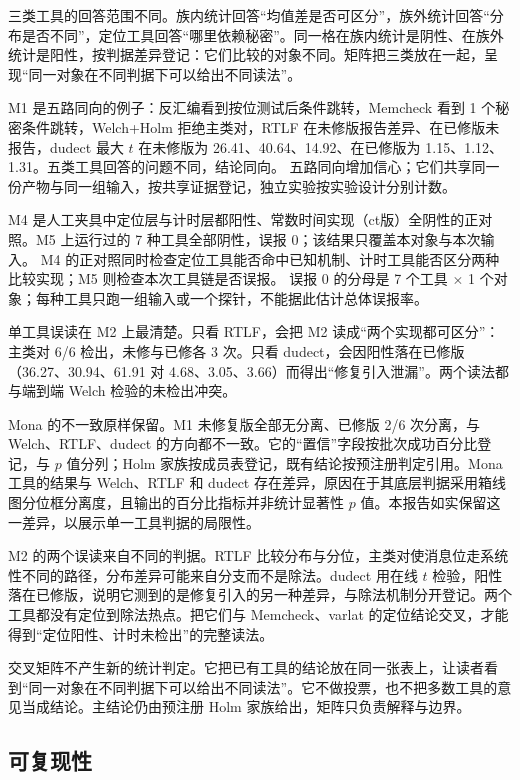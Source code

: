 三类工具的回答范围不同。族内统计回答“均值差是否可区分”，族外统计回答“分布是否不同”，定位工具回答“哪里依赖秘密”。同一格在族内统计是阴性、在族外统计是阳性，按判据差异登记：它们比较的对象不同。矩阵把三类放在一起，呈现“同一对象在不同判据下可以给出不同读法”。

M1 是五路同向的例子：反汇编看到按位测试后条件跳转，Memcheck 看到 1 个秘密条件跳转，Welch+Holm 拒绝主类对，RTLF 在未修版报告差异、在已修版未报告，dudect 最大 $t$ 在未修版为 26.41、40.64、14.92、在已修版为 1.15、1.12、1.31。五类工具回答的问题不同，结论同向。
五路同向增加信心；它们共享同一份产物与同一组输入，按共享证据登记，独立实验按实验设计分别计数。

M4 是人工夹具中定位层与计时层都阳性、常数时间实现（ct版）全阴性的正对照。M5 上运行过的 7 种工具全部阴性，误报 0；该结果只覆盖本对象与本次输入。
M4 的正对照同时检查定位工具能否命中已知机制、计时工具能否区分两种比较实现；M5 则检查本次工具链是否误报。
误报 0 的分母是 7 个工具 $\times$ 1 个对象；每种工具只跑一组输入或一个探针，不能据此估计总体误报率。

单工具误读在 M2 上最清楚。只看 RTLF，会把 M2 读成“两个实现都可区分”：主类对 6/6 检出，未修与已修各 3 次。只看 dudect，会因阳性落在已修版（36.27、30.94、61.91 对 4.68、3.05、3.66）而得出“修复引入泄漏”。两个读法都与端到端 Welch 检验的未检出冲突。\cite{dudect}

Mona 的不一致原样保留。M1 未修复版全部无分离、已修版 2/6 次分离，与 Welch、RTLF、dudect 的方向都不一致。它的“置信”字段按批次成功百分比登记，与 $p$ 值分列；Holm 家族按成员表登记，既有结论按预注册判定引用。Mona 工具的结果与 Welch、RTLF 和 dudect 存在差异，原因在于其底层判据采用箱线图分位框分离度，且输出的百分比指标并非统计显著性 $p$ 值。本报告如实保留这一差异，以展示单一工具判据的局限性。

M2 的两个误读来自不同的判据。RTLF 比较分布与分位，主类对使消息位走系统性不同的路径，分布差异可能来自分支而不是除法。dudect 用在线 $t$ 检验，阳性落在已修版，说明它测到的是修复引入的另一种差异，与除法机制分开登记。两个工具都没有定位到除法热点。把它们与 Memcheck、varlat 的定位结论交叉，才能得到“定位阳性、计时未检出”的完整读法。





交叉矩阵不产生新的统计判定。它把已有工具的结论放在同一张表上，让读者看到“同一对象在不同判据下可以给出不同读法”。它不做投票，也不把多数工具的意见当成结论。主结论仍由预注册 Holm 家族给出，矩阵只负责解释与边界。

\subsection{可复现性}

